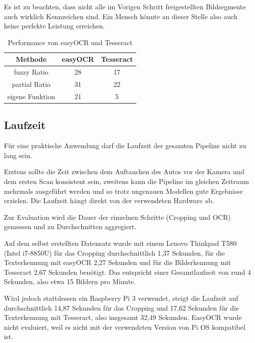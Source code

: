 Es ist zu beachten, dass nicht alle im Vorigen Schritt freigestellten Bildsegmente auch wirklich Kennzeichen sind. Ein Mensch könnte an dieser Stelle also auch keine perfekte Leistung erreichen. 

\begin{table}[h]
\begin{center}
\begin{tabular}{ c | c | c }

Methode & easyOCR & Tesseract \\
\hline
fuzzy Ratio & 28 & 17 \\
partial Ratio & 31 & 22 \\
eigene Funktion & 21 & 5 \\

\end{tabular}
\caption{Performance von easyOCR und Tesseract}
\label{Tabelle:1}
\end{center}
\end{table}

\subsection{Laufzeit}

Für eine praktische Anwendung darf die Laufzeit der gesamten Pipeline nicht zu lang sein.

Erstens sollte die Zeit zwischen dem Auftauchen des Autos vor der Kamera und dem ersten Scan konsistent sein,
zweitens kann die Pipeline im gleichen Zeitraum mehrmals ausgeführt werden und so trotz ungenauen Modellen gute Ergebnisse erzielen.
Die Laufzeit hängt direkt von der verwendeten Hardware ab.

Zur Evaluation wird die Dauer der einzelnen Schritte (Cropping und OCR) gemessen und zu Durchschnitten aggregiert. 

Auf dem selbst erstellten Datensatz wurde mit einem Lenovo Thinkpad T580 (Intel i7-8850U) für das Cropping durchschnittlich 1,37 Sekunden,
für die Texterkennung mit easyOCR 2,27 Sekunden und für die Bilderkennung mit Tesseract 2,67 Sekunden benötigt.
Das entspricht einer Gesamtlaufzeit von rund 4 Sekunden, also etwa 15 Bildern pro Minute.

Wird jedoch stattdessen ein Raspberry Pi 3 verwendet, steigt die Laufzeit auf durchschnittlich 14,87 Sekunden für das Cropping und 17,62 Sekunden für die Texterkennung mit Tesseract, also insgesamt 32,49 Sekunden.
EasyOCR wurde nicht evaluiert, weil es nicht mit der verwendeten Version von Pi OS kompatibel ist.

